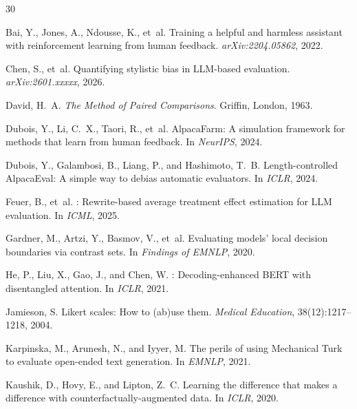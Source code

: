\documentclass[11pt,a4paper]{article}
\begin{document}
\begin{thebibliography}{30}

Bai, Y., Jones, A., Ndousse, K., et~al.
\newblock Training a helpful and harmless assistant with reinforcement learning from human feedback.
\newblock \emph{arXiv:2204.05862}, 2022.

Chen, S., et~al.
\newblock Quantifying stylistic bias in LLM-based evaluation.
\newblock \emph{arXiv:2601.xxxxx}, 2026.

David, H.~A.
\newblock \emph{The Method of Paired Comparisons}.
\newblock Griffin, London, 1963.

Dubois, Y., Li, C.~X., Taori, R., et~al.
\newblock AlpacaFarm: A simulation framework for methods that learn from human feedback.
\newblock In \emph{NeurIPS}, 2024.

Dubois, Y., Galambosi, B., Liang, P., and Hashimoto, T.~B.
\newblock Length-controlled AlpacaEval: A simple way to debias automatic evaluators.
\newblock In \emph{ICLR}, 2024.

Feuer, B., et~al.
: Rewrite-based average treatment effect estimation for LLM evaluation.
\newblock In \emph{ICML}, 2025.

Gardner, M., Artzi, Y., Basmov, V., et~al.
\newblock Evaluating models' local decision boundaries via contrast sets.
\newblock In \emph{Findings of EMNLP}, 2020.

He, P., Liu, X., Gao, J., and Chen, W.
: Decoding-enhanced {BERT} with disentangled attention.
\newblock In \emph{ICLR}, 2021.

Jamieson, S.
\newblock Likert scales: How to (ab)use them.
\newblock \emph{Medical Education}, 38(12):1217--1218, 2004.

Karpinska, M., Arunesh, N., and Iyyer, M.
\newblock The perils of using {M}echanical {T}urk to evaluate open-ended text generation.
\newblock In \emph{EMNLP}, 2021.

Kaushik, D., Hovy, E., and Lipton, Z.~C.
\newblock Learning the difference that makes a difference with counterfactually-augmented data.
\newblock In \emph{ICLR}, 2020.


\end{thebibliography}
\end{document}
